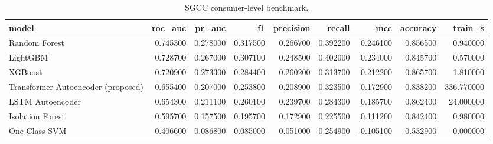 \begin{table}
\caption{SGCC consumer-level benchmark.}
\label{tab:sgcc_bench}
\begin{tabular}{lrrrrrrrr}
\toprule
model & roc_auc & pr_auc & f1 & precision & recall & mcc & accuracy & train_s \\
\midrule
Random Forest & 0.745300 & 0.278000 & 0.317500 & 0.266700 & 0.392200 & 0.246100 & 0.856500 & 0.940000 \\
LightGBM & 0.728700 & 0.267000 & 0.307100 & 0.248500 & 0.402000 & 0.234000 & 0.845700 & 0.570000 \\
XGBoost & 0.720900 & 0.273300 & 0.284400 & 0.260200 & 0.313700 & 0.212200 & 0.865700 & 1.810000 \\
Transformer Autoencoder (proposed) & 0.655400 & 0.207000 & 0.253800 & 0.208900 & 0.323500 & 0.172900 & 0.838200 & 336.770000 \\
LSTM Autoencoder & 0.654300 & 0.211100 & 0.260100 & 0.239700 & 0.284300 & 0.185700 & 0.862400 & 24.000000 \\
Isolation Forest & 0.595700 & 0.157500 & 0.195700 & 0.172900 & 0.225500 & 0.111200 & 0.842400 & 0.980000 \\
One-Class SVM & 0.406600 & 0.086800 & 0.085000 & 0.051000 & 0.254900 & -0.105100 & 0.532900 & 0.000000 \\
\bottomrule
\end{tabular}
\end{table}
